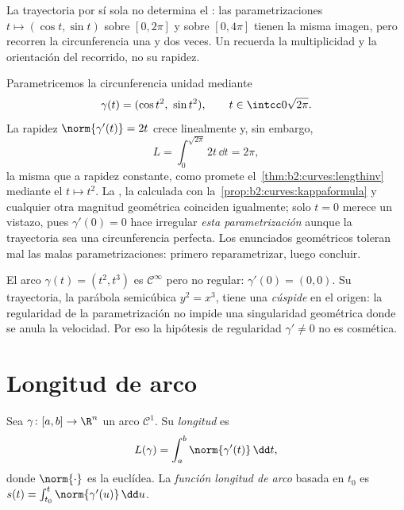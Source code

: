 \begin{remark}
La trayectoria por sí sola no determina el : las
parametrizaciones $t \mapsto (\cos t, \sin t)$ sobre $[0, 2\pi]$ y
sobre $[0, 4\pi]$ tienen la misma imagen, pero recorren la
circunferencia una y dos veces. Un  recuerda la
multiplicidad y la orientación del recorrido, no su rapidez.
\end{remark}

\begin{example}\label{ex:b2:curves:speedinvariance}
Parametricemos la circunferencia unidad mediante
\[
\gamma(t) = (\cos t^2,\ \sin t^2),
\qquad t \in \intcc0{\sqrt{2\pi}} .
\]
La rapidez $\norm{\gamma'(t)} = 2t$ crece linealmente y, sin
embargo,
\[
L = \int_0^{\sqrt{2\pi}}2t\,\dd t = 2\pi ,
\]
la misma  que a rapidez constante, como promete el~\cref{thm:b2:curves:lengthinv} mediante el  $t
\mapsto t^2$. La , la  calculada con la~\cref{prop:b2:curves:kappaformula} y cualquier otra magnitud
geométrica coinciden igualmente; solo $t = 0$ merece un vistazo,
pues $\gamma'(0) = 0$ hace irregular \emph{esta parametrización}
aunque la trayectoria sea una circunferencia perfecta. Los
enunciados geométricos toleran mal las malas parametrizaciones:
primero reparametrizar, luego concluir.
\end{example}

\begin{example}\label{ex:b2:curves:cusp}
El arco $\gamma(t) = (t^2, t^3)$ es $\mathcal{C}^\infty$ pero no
regular: $\gamma'(0) = (0, 0)$. Su trayectoria, la parábola
semicúbica $y^2 = x^3$, tiene una \emph{cúspide} en el origen: la
regularidad de la parametrización no impide una singularidad
geométrica donde se anula la velocidad. Por eso la hipótesis de
regularidad $\gamma' \neq 0$ no es cosmética.
\end{example}

\section{Longitud de arco}

\begin{definition}\label{def:b2:curves:length}
Sea $\gamma \colon [a, b] \to \R^n$ un arco $\mathcal{C}^1$. Su
\emph{longitud} es
\[
L(\gamma) = \int_a^b \norm{\gamma'(t)}\, \dd t ,
\]
donde $\norm{\cdot}$ es la  euclídea. La \emph{función longitud
de arco} basada en $t_0$ es $s(t) =
\int_{t_0}^t \norm{\gamma'(u)}\,\dd u$.
\end{definition}

